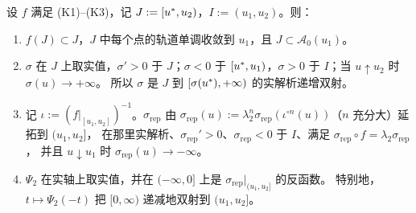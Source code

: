 \begin{lemma}[实轴上的结构]\label{ch2:lem:real-koenigs}
设 $f$ 满足 \textup{(K1)--(K3)}，记 $J:=[u^{*},u_2)$，$I:=(u_1,u_2)$。则：
\begin{enumerate}[label=(\alph*)]
\item $f(J)\subset J$，$J$ 中每个点的轨道单调收敛到 $u_1$，且 $J\subset\mathcal A_0(u_1)$。
\item $\sigma$ 在 $J$ 上取实值，$\sigma'>0$ 于 $J$；$\sigma<0$ 于 $[u^{*},u_1)$，$\sigma>0$ 于 $I$；当 $u\uparrow u_2$ 时 $\sigma(u)\to+\infty$。
  所以 $\sigma$ 是 $J$ 到 $[\sigma(u^{*}),+\infty)$ 的实解析递增双射。
\item 记 $\iota:=(f|_{[u_1,u_2]})^{-1}$。$\sigma_{\mathrm{rep}}$ 由 $\sigma_{\mathrm{rep}}(u):=\lambda_2^n\sigma_{\mathrm{rep}}(\iota^{\circ n}(u))$（$n$ 充分大）延拓到 $(u_1,u_2]$，
  在那里实解析、$\sigma_{\mathrm{rep}}'>0$、$\sigma_{\mathrm{rep}}<0$ 于 $I$、满足 $\sigma_{\mathrm{rep}}\circ f=\lambda_2\sigma_{\mathrm{rep}}$，
  并且 $u\downarrow u_1$ 时 $\sigma_{\mathrm{rep}}(u)\to-\infty$。
\item $\Psi_2$ 在实轴上取实值，并在 $(-\infty,0]$ 上是 $\sigma_{\mathrm{rep}}|_{(u_1,u_2]}$ 的反函数。
  特别地，$t\mapsto\Psi_2(-t)$ 把 $[0,\infty)$ 递减地双射到 $(u_1,u_2]$。
\end{enumerate}
\end{lemma}

